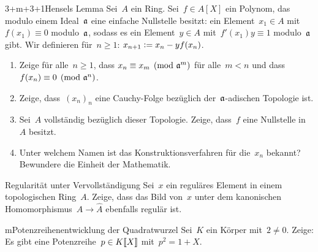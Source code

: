 \documentclass{uebblatt}
\begin{document}
\begin{aufgabe}{3+m+3+1}{Hensels Lemma}
Sei~$A$ ein Ring. Sei~$f \in A[X]$ ein
Polynom, das modulo einem Ideal~$\mathfrak{a}$ eine einfache Nullstelle besitzt: ein Element~$x_1
\in A$ mit~$f(x_1) \equiv 0$ modulo~$\mathfrak{a}$, sodass es ein Element~$y \in A$
mit~$f'(x_1) y \equiv 1$ modulo~$\mathfrak{a}$ gibt.
Wir definieren für~$n \geq 1$: $x_{n+1} \vcentcolon= x_n - y f(x_n)$.
\begin{enumerate}
\item Zeige für alle~$n \geq 1$, dass $x_n \equiv x_m \pmod{\mathfrak{a}^m}$ für
alle~$m < n$ und dass~$f(x_n) \equiv 0 \pmod{\mathfrak{a}^n}$.
\item Zeige, dass~$(x_n)_n$ eine Cauchy-Folge bezüglich der~$\mathfrak{a}$-adischen
Topologie ist.
\item Sei~$A$ vollständig bezüglich dieser Topologie. Zeige,
dass~$f$ eine Nullstelle in~$A$ besitzt.
\item Unter welchem Namen ist das Konstruktionsverfahren für die~$x_n$ bekannt?
Bewundere die Einheit der Mathematik.
\end{enumerate}
\end{aufgabe}

\begin{aufgabe}{2}{Regularität unter Vervollständigung}
Sei~$x$ ein reguläres Element in einem topologischen Ring~$A$. Zeige, dass das
Bild von~$x$ unter dem kanonischen Homomorphismus~$A \to \hat A$ ebenfalls regulär ist.
\end{aufgabe}

\begin{aufgabe}{m}{Potenzreihenentwicklung der Quadratwurzel}
Sei~$K$ ein Körper mit~$2 \neq 0$. Zeige: Es gibt eine Potenzreihe~$p \in
{K}\llbracket{X}\rrbracket$ mit~$p^2 = 1 + X$.
\end{aufgabe}
\end{document}
